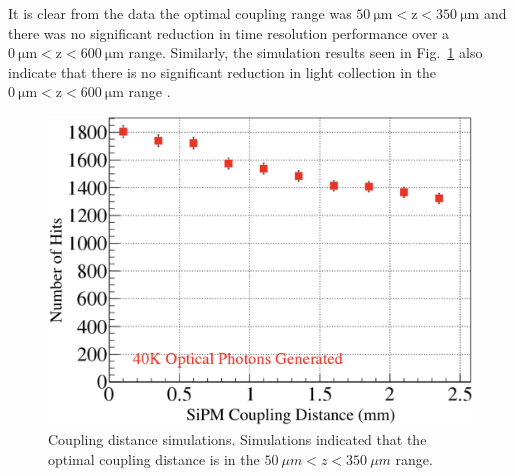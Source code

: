 It is clear from the data the optimal coupling range was $\mathrm{50\ \mu m < z < 350\ \mu m}$ and there was no significant reduction in time resolution performance over a $\mathrm{0\ \mu m < z < 600\ \mu m}$ range.  Similarly, the simulation results seen in Fig.~\ref{fig:spacing_sim} also indicate that there is no significant reduction in light collection in the $\mathrm{0\ \mu m < z < 600\ \mu m}$ range \cite{puneet_sim_talk}.
\begin{figure}[!htb]
	\centering
	\includegraphics[width=1.0\columnwidth]{misalignment/figs/spacing_sim}
	\caption{Coupling distance simulations. Simulations indicated that the optimal coupling distance is in the $50\ \mu m < z < 350\ \mu m$ range.}
	\label{fig:spacing_sim}
\end{figure}


